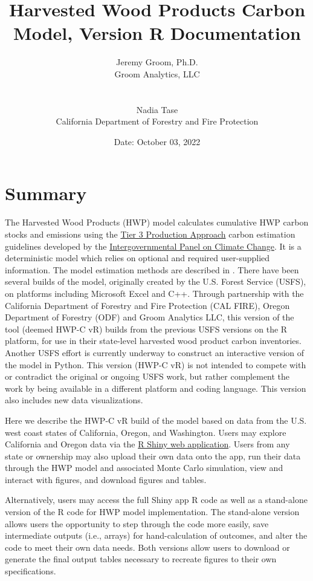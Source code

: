 \documentclass[
  openany]{book}
\title{Harvested Wood Products Carbon Model, Version R Documentation}
\author{Jeremy Groom, Ph.D.\\
Groom Analytics, LLC\\
\strut \\
Nadia Tase\\
California Department of Forestry and Fire Protection}
\date{Date: October 03, 2022}
\begin{document}
\maketitle

{
\setcounter{tocdepth}{1}
\tableofcontents
}
\hypertarget{sum}{%
\chapter{Summary}\label{sum}}

The Harvested Wood Products (HWP) model calculates cumulative HWP carbon stocks and emissions using the \href{https://www.ipcc-nggip.iges.or.jp/public/2006gl/pdf/4_Volume4/V4_04_Ch4_Forest_Land.pdf}{Tier 3 Production Approach} carbon estimation guidelines developed by the \href{https://www.ipcc.ch/}{Intergovernmental Panel on Climate Change}. It is a deterministic model which relies on optional and required user-supplied information. The model estimation methods are described in \textcite{stockmann2012}. There have been several builds of the model, originally created by the U.S. Forest Service (USFS), on platforms including Microsoft Excel and C++. Through partnership with the California Department of Forestry and Fire Protection (CAL FIRE), Oregon Department of Forestry (ODF) and Groom Analytics LLC, this version of the tool (deemed HWP-C vR) builds from the previous USFS versions on the R \autocite{R-base} platform, for use in their state-level harvested wood product carbon inventories. Another USFS effort is currently underway to construct an interactive version of the model in Python. This version (HWP-C vR) is not intended to compete with or contradict the original or ongoing USFS work, but rather complement the work by being available in a different platform and coding language. This version also includes new data visualizations.

Here we describe the HWP-C vR build of the model based on data from the U.S. west coast states of California, Oregon, and Washington. Users may explore California and Oregon data via the \href{https://groomanalyticsllc.shinyapps.io/HWP-C-vR/}{R Shiny web application}. Users from any state or ownership may also upload their own data onto the app, run their data through the HWP model and associated Monte Carlo simulation, view and interact with figures, and download figures and tables.

Alternatively, users may access the full Shiny app R code as well as a stand-alone version of the R code for HWP model implementation. The stand-alone version allows users the opportunity to step through the code more easily, save intermediate outputs (i.e., arrays) for hand-calculation of outcomes, and alter the code to meet their own data needs. Both versions allow users to download or generate the final output tables necessary to recreate figures to their own specifications.
\end{document}
